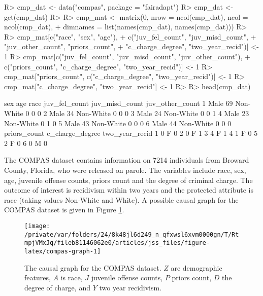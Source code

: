 \documentclass[
  nojss]{jss}
\begin{document}
\begin{CodeChunk}
\begin{CodeInput}
R> cmp_dat <- data("compas", package = "fairadapt")
R> cmp_dat <- get(cmp_dat)
R> 
R> cmp_mat <- matrix(0, nrow = ncol(cmp_dat), ncol = ncol(cmp_dat),
+                   dimnames = list(names(cmp_dat), names(cmp_dat)))
R> 
R> cmp_mat[c("race", "sex", "age"),
+         c("juv_fel_count", "juv_misd_count",
+           "juv_other_count", "priors_count",
+           "c_charge_degree", "two_year_recid")] <- 1
R> cmp_mat[c("juv_fel_count", "juv_misd_count", "juv_other_count"),
+         c("priors_count", "c_charge_degree", "two_year_recid")] <- 1
R> cmp_mat["priors_count", c("c_charge_degree", "two_year_recid")] <- 1
R> cmp_mat["c_charge_degree", "two_year_recid"] <- 1
R> 
R> head(cmp_dat)
\end{CodeInput}
\begin{CodeOutput}
   sex age      race juv_fel_count juv_misd_count juv_other_count
1 Male  69 Non-White             0              0               0
2 Male  34 Non-White             0              0               0
3 Male  24 Non-White             0              0               1
4 Male  23 Non-White             0              1               0
5 Male  43 Non-White             0              0               0
6 Male  44 Non-White             0              0               0
  priors_count c_charge_degree two_year_recid
1            0               F              0
2            0               F              1
3            4               F              1
4            1               F              0
5            2               F              0
6            0               M              0
\end{CodeOutput}
\end{CodeChunk}

The COMPAS dataset contains information on 7214 individuals from Broward
County, Florida, who were released on parole. The variables include
race, sex, age, juvenile offense counts, priors count and the degree of
criminal charge. The outcome of interest is recidivism within two years
and the protected attribute is race (taking values Non-White and White).
A possible causal graph for the COMPAS dataset is given in Figure
\ref{fig:compas-graph}.

\begin{CodeChunk}
\begin{figure}

{\centering \texttt{[image: /private/var/folders/24/8k48jl6d249\_n\_qfxwsl6xvm0000gn/T/RtmpjVMxJq/fileb81146062e0/articles/jss\_files/figure-latex/compas-graph-1]} 

}

\caption[The causal graph for the COMPAS dataset]{The causal graph for the COMPAS dataset. $Z$ are demographic features, $A$ is race, $J$ juvenile offense counts, $P$ priors count, $D$ the degree of charge, and $Y$ two year recidivism.}\label{fig:compas-graph}
\end{figure}
\end{CodeChunk}
\end{document}
